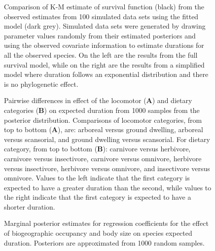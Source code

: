 \documentclass[12pt]{article}
\begin{document}
\clearpage


\begin{figure}[ht]
  \caption{Comparison of K-M estimate of survival function (black) from the observed estimates from 100 simulated data sets using the fitted model (dark grey). Simulated data sets were generated by drawing parameter values randomly from their estimated posteriors and using the observed covariate information to estimate durations for all the observed species. On the left are the results from the full survival model, while on the right are the results from a simplified model where duration follows an exponential distribution and there is no phylogenetic effect.}
  \label{fig:ppc_surv}
\end{figure}


\begin{figure}[ht]
  \caption{Pairwise differences in effect of the locomotor (\textbf{A}) and dietary categories (\textbf{B}) on expected duration from 1000 samples from the posterior distribution. Comparisons of locomotor categories, from top to bottom (\textbf{A}), are: arboreal versus ground dwelling, arboreal versus scansorial, and ground dwelling versus scansorial. For dietary category, from top to bottom (\textbf{B}): carnivore versus herbivore, carnivore versus insectivore, carnivore versus omnivore, herbivore versus insectivore, herbivore versus omnivore, and insectivore versus omnivore. Values to the left indicate that the first category is expected to have a greater duration than the second, while values to the right indicate that the first category is expected to have a shorter duration.}
  \label{fig:trait_est}
\end{figure}

\begin{figure}[ht]
  \caption{Marginal posterior estimates for regression coefficients for the effect of biogeographic occupancy and body size on species expected duration. Posteriors are approximated from 1000 random samples.}
  \label{fig:eff_other}
\end{figure}
\end{document}
